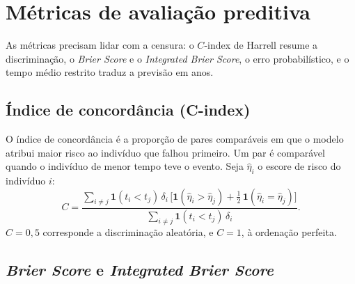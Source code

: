 \section{Métricas de avaliação preditiva}
\label{sec:avaliacao_metodos}

As métricas precisam lidar com a censura: o $C$-index de Harrell resume a discriminação, o \textit{Brier Score} e o \textit{Integrated Brier Score}, o erro probabilístico, e o tempo médio restrito traduz a previsão em anos.

    \subsection{Índice de concordância (C-index)}
    \label{subsec:cindex}

O índice de concordância \citep{harrell1982,harrell2001} é a proporção de pares comparáveis em que o modelo atribui maior risco ao indivíduo que falhou primeiro. Um par é comparável quando o indivíduo de menor tempo teve o evento. Seja $\hat{\eta}_i$ o escore de risco do indivíduo $i$:
\begin{equation}
    C = \frac{\sum_{i \neq j} \mathbf{1}(t_i < t_j)\,\delta_i\,
              \bigl[\mathbf{1}(\hat{\eta}_i > \hat{\eta}_j) + \tfrac{1}{2}\,\mathbf{1}(\hat{\eta}_i = \hat{\eta}_j)\bigr]}
             {\sum_{i \neq j} \mathbf{1}(t_i < t_j)\,\delta_i}.
    \label{eq:cindex}
\end{equation}
$C = 0{,}5$ corresponde a discriminação aleatória, e $C = 1$, à ordenação perfeita.

    \subsection{\textit{Brier Score} e \textit{Integrated Brier Score}}
    \label{subsec:brier}

